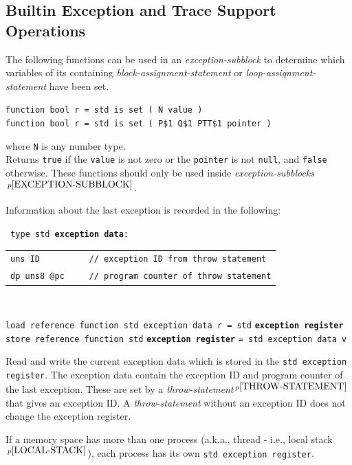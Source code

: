 \documentclass[12pt]{article}
\newcommand{\ttkey}[1]{{\tt \bfseries #1}}
\newcommand{\pagnote}[1]{$\,^{p\pageref{#1}}$}
\newenvironment{indpar}[1][0.3in]%
	{\begin{list}{}%
		     {\setlength{\itemsep}{0in}%
		      \setlength{\topsep}{0in}%
		      \setlength{\parsep}{1ex}%
		      \setlength{\labelwidth}{#1}%
		      \setlength{\leftmargin}{#1}%
		      \addtolength{\leftmargin}{\labelsep}}%
	 \item}%
	{\end{list}}
\begin{document}
\subsection{Builtin Exception and Trace Support Operations}
\label{BUILTIN-EXCEPTION-AND-TRACE-SUPPORT-OPERATIONS}

The following functions can be used in an {\em exception-subblock}
to determine which variables of its containing
{\em block-assignment-statement} or {\em loop-assignment-statement}
have been set.

{\tt function bool r = std is set ( N value )} \\
{\tt function bool r = std is set ( P\$1 Q\$1 PTT\$1 pointer )}%
\label{IS-SET}
\begin{indpar}
where {\tt N} is any number type.
\\[1ex]
Returns {\tt true} if the {\tt value} is not zero or the {\tt pointer}
is not {\tt null}, and {\tt false} otherwise.
These functions should only be used inside
{\em exception-subblocks}\pagnote{EXCEPTION-SUBBLOCK}.
\end{indpar}

Information about the last exception is recorded in the following:

{\tt
type~std~\ttkey{exception data}: \\
\begin{tabular}[t]{@{~~~~~}l}
\tt uns~ID~~~~~~~~~~// exception ID from throw statement \\
\tt dp~uns8~@pc~~~~~// program counter of throw statement\\
\end{tabular} \\
}
{\tt load reference function std exception data r = std}
    \ttkey{exception register} \\
{\tt store reference function std} \ttkey{exception register}
    {\tt = std exception data v}
\begin{indpar}
Read and write the current exception data which is stored in the
{\tt std exception register}.
The exception data contain the exception ID and program counter
of the last exception.  These are set by
a {\em throw-statement}\pagnote{THROW-STATEMENT} that
gives an exception ID.   A {\em throw-statement} without an exception ID
does not change the exception register.

If a memory space has more than one process (a.k.a., thread - i.e., local
stack\pagnote{LOCAL-STACK}), each process has its own
{\tt std exception register}.
\end{indpar}
\end{document}
